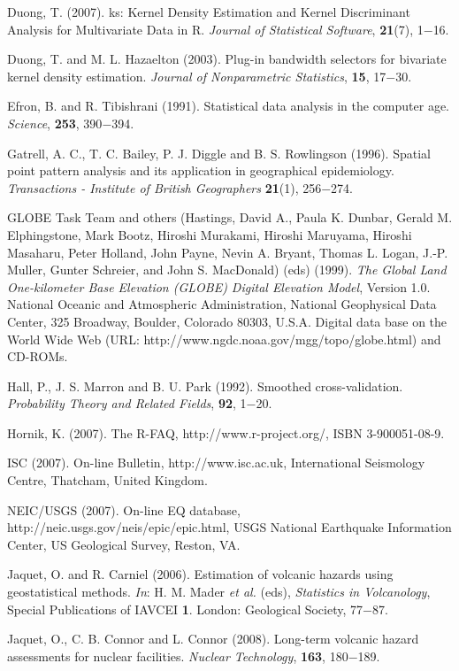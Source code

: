 \documentclass[10pt]{article}
\begin{document}
\begin{thebibliography}{99}
{
Duong, T. (2007). ks: Kernel Density Estimation and Kernel Discriminant Analysis for Multivariate Data in R. {\it Journal of Statistical Software}, {\bf 21}(7), 1$-$16.

Duong, T. and M. L. Hazaelton (2003). Plug-in bandwidth selectors for bivariate kernel density estimation. {\it Journal of Nonparametric Statistics}, {\bf 15}, 17$-$30.

Efron, B. and R. Tibishrani (1991). Statistical data analysis in the computer age. {\it Science}, {\bf 253}, 390$-$394.

Gatrell, A. C., T. C. Bailey, P. J. Diggle and B. S. Rowlingson (1996). Spatial point pattern analysis and its application in geographical epidemiology. {\it Transactions - Institute of British Geographers} {\bf 21}(1), 256$-$274.

GLOBE Task Team and others (Hastings, David A., Paula K. Dunbar, Gerald M. Elphingstone, Mark Bootz, Hiroshi Murakami, Hiroshi Maruyama, Hiroshi Masaharu, Peter Holland, John Payne, Nevin A. Bryant, Thomas L. Logan, J.-P. Muller, Gunter Schreier, and John S. MacDonald) (eds) (1999). {\it The Global Land One-kilometer Base Elevation (GLOBE) Digital Elevation Model}, Version 1.0. National Oceanic and Atmospheric Administration, National Geophysical Data Center, 325 Broadway, Boulder, Colorado 80303, U.S.A. Digital data base on the World Wide Web (URL: http://www.ngdc.noaa.gov/mgg/topo/globe.html) and CD-ROMs.

Hall, P., J. S. Marron and B. U. Park (1992). Smoothed cross-validation. {\it Probability Theory and Related Fields}, {\bf 92}, 1$-$20.

Hornik, K. (2007).  The R-FAQ, http://www.r-project.org/, ISBN 3-900051-08-9.

ISC (2007). On-line Bulletin, http://www.isc.ac.uk, International  Seismology Centre, Thatcham, United Kingdom.

NEIC/USGS (2007). On-line EQ database, http://neic.usgs.gov/neis/epic/epic.html, USGS National Earthquake Information Center, US Geological Survey, Reston, VA.

Jaquet, O. and R. Carniel (2006).  Estimation of volcanic hazards using geostatistical methods. {\it In}: H. M. Mader {\it et al.} (eds), {\it Statistics in Volcanology}, Special Publications of IAVCEI {\bf 1}. London: Geological Society, 77$-$87.

Jaquet, O., C. B. Connor and L. Connor (2008). Long-term volcanic hazard assessments for nuclear facilities. {\it Nuclear Technology}, {\bf 163}, 180$-$189.

}
\end{thebibliography}
\end{document}
